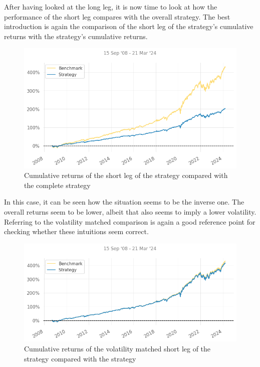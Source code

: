
After having looked at the long leg, it is now time to look at how the performance of the short leg compares with the overall strategy. The best introduction is again the comparison of the short leg of the strategy's cumulative returns with the strategy's cumulative returns.

\begin{figure}[ht]
    \captionsetup{justification=centering}
    \includegraphics[width=\linewidth]{assets/short-vs-strat.png}
    \caption{Cumulative returns of the short leg of the strategy compared with the complete strategy}
    \label{fig:short-vs-strat}
\end{figure}

In this case, it can be seen how the situation seems to be the inverse one. The overall returns seem to be lower, albeit that also seems to imply a lower volatility. Referring to the volatility matched comparison is again a good reference point for checking whether these intuitions seem correct.
\newpage
\begin{figure}[ht]
    \captionsetup{justification=centering}
    \includegraphics[width=\linewidth]{assets/short-vs-strat-vol-matched.png}
    \caption{Cumulative returns of the volatility matched short leg of the strategy compared with the strategy}
    \label{fig:short-vs-strat-vol-matched}
\end{figure}

